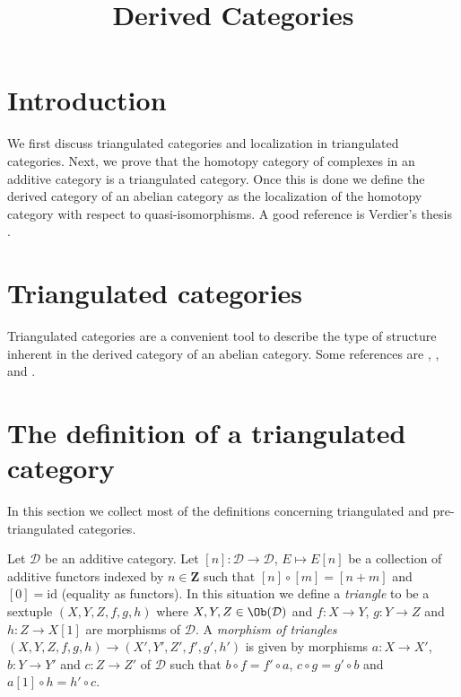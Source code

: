 

%


\title{Derived Categories}


\maketitle

\label{section-phantom}

\tableofcontents

\section{Introduction}
\label{section-introduction}

\noindent
We first discuss triangulated categories and localization in triangulated
categories. Next, we prove that the homotopy category of complexes in an
additive category is a triangulated category. Once this is done we define
the derived category of an abelian category as the localization of the
homotopy category with respect to quasi-isomorphisms.
A good reference is Verdier's thesis \cite{Verdier}.



\section{Triangulated categories}
\label{section-triangulated-categories}

\noindent
Triangulated categories are a convenient tool to describe the type
of structure inherent in the derived category of an abelian category.
Some references are \cite{Verdier}, \cite{KS}, and \cite{Neeman}.




\section{The definition of a triangulated category}
\label{section-triangulated-definitions}

\noindent
In this section we collect most of the definitions concerning triangulated
and pre-triangulated categories.

\begin{definition}
\label{definition-triangle}
Let $\mathcal{D}$ be an additive category.
Let $[n] : \mathcal{D} \to \mathcal{D}$, $E \mapsto E[n]$
be a collection of additive functors indexed by $n \in \mathbf{Z}$ such that
$[n] \circ [m] = [n + m]$  and $[0] = \text{id}$ (equality as functors).
In this situation we define a {\it triangle} to be a sextuple
$(X, Y, Z, f, g, h)$ where $X, Y, Z \in \Ob(\mathcal{D})$ and
$f : X \to Y$, $g : Y \to Z$ and $h : Z \to X[1]$ are morphisms
of $\mathcal{D}$.
A {\it morphism of triangles}
$(X, Y, Z, f, g, h) \to (X', Y', Z', f', g', h')$
is given by morphisms $a : X \to X'$, $b : Y \to Y'$ and $c : Z \to Z'$
of $\mathcal{D}$ such that
$b \circ f = f' \circ a$, $c  \circ g = g' \circ b$ and
$a[1] \circ h = h' \circ c$.
\end{definition}


